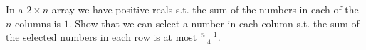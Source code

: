 \begin{problem}
    In a $2\times n$ array we have positive reals s.t. the sum of the numbers in each of the $n$ columns is $1$. Show that we can select a number in each column s.t. the sum of the selected numbers in each row is at most $\frac{n+1}4$.

    \label{05RUS102}
\end{problem}